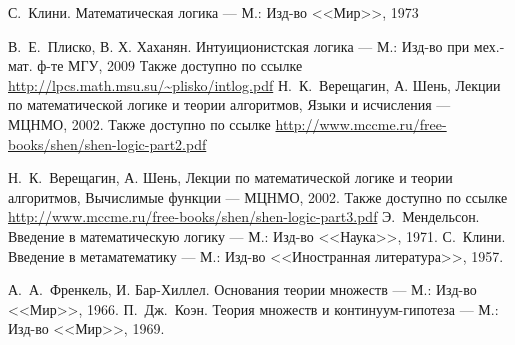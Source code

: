
\begin{thebibliography}{99}


 С.~Клини. Математическая логика --- М.: Изд-во <<Мир>>, 1973


 В.~Е.~Плиско, В. Х. Хаханян. Интуиционистская логика --- М.: Изд-во при мех.-мат. ф-те МГУ,
2009
 Также доступно по ссылке \url{http://lpcs.math.msu.su/~plisko/intlog.pdf}
 Н.~К.~Верещагин, А. Шень, Лекции по математической логике и теории алгоритмов, Языки и исчисления --- МЦНМО, 2002.
 Также доступно по ссылке \url{http://www.mccme.ru/free-books/shen/shen-logic-part2.pdf}


 Н.~К.~Верещагин, А. Шень, Лекции по математической логике и теории алгоритмов, Вычислимые функции --- МЦНМО, 2002.
 Также доступно по ссылке \url{http://www.mccme.ru/free-books/shen/shen-logic-part3.pdf}
 Э.~Мендельсон. Введение в математическую логику --- М.: Изд-во <<Наука>>, 1971.
 С.~Клини. Введение в метаматематику --- М.: Изд-во <<Иностранная литература>>, 1957.


 А.~А.~Френкель, И. Бар-Хиллел. Основания теории множеств --- М.: Изд-во <<Мир>>, 1966.
 П.~Дж.~Коэн. Теория множеств и континуум-гипотеза --- М.: Изд-во <<Мир>>, 1969.

\end{thebibliography}